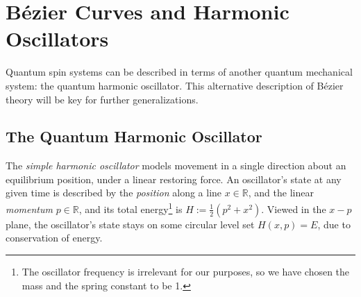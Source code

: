 \documentclass[final,3p,mathptmx]{elsarticle}
\begin{document}
\section{B\'{e}zier Curves and Harmonic Oscillators}\label{sec:bezier_osc}
Quantum spin systems can be described in terms of another quantum mechanical system: the quantum harmonic oscillator. This alternative description of B\'{e}zier theory will be key for further generalizations.

\subsection{The Quantum Harmonic Oscillator}
The \emph{simple harmonic oscillator} models movement in a single direction about an equilibrium position, under a linear restoring force. An oscillator's state at any given time is described by the \emph{position} along a line $x \in \mathbb{R}$, and the linear \emph{momentum} $p \in \mathbb{R}$, and its total energy\footnote{The oscillator frequency is irrelevant for our purposes, so we have chosen the mass and the spring constant to be 1.} is $H := \frac{1}{2}(p^{2} + x^{2})$. Viewed in the $x-p$ plane, the oscillator's state stays on some circular level set $H(x,p) = E$, due to conservation of energy.
\end{document}
